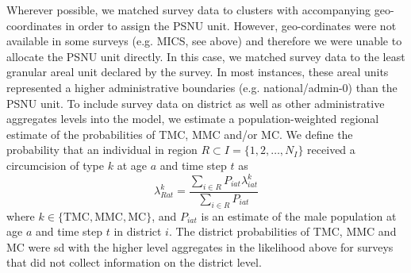 \documentclass{article}
\begin{document}
\begin{appendix}
Wherever possible, we matched survey data to clusters with accompanying geo-coordinates in order to assign the PSNU unit. However, geo-cordinates were not available in some surveys (e.g. MICS, see above) and therefore we were unable to allocate the PSNU unit directly. In this case, we matched survey data to the least granular areal unit declared by the survey. In most instances, these areal units represented a higher administrative boundaries (e.g. national/admin-0) than the PSNU unit. To include survey data on district as well as other administrative aggregates levels into the model, we estimate a population-weighted regional estimate of the probabilities of TMC, MMC and/or MC. We define the probability that an individual in region $ R \subset I = \{1, 2, \ldots, N_I\}$ received a circumcision of type $k$ at age $a$ and time step $t$ as 
\begin{equation*}
	\lambda^{k}_{Rat} = \frac{\sum_{i\in R}P_{iat}\lambda^{k}_{iat}}{\sum_{i\in R}P_{iat}}
\end{equation*}
where $k\in \{\textrm{TMC}, \textrm{MMC}, \textrm{MC}\}$, and $P_{iat}$ is an estimate of the male population at age $a$ and time step $t$ in district $i$. The district probabilities of TMC, MMC and MC were sd with the higher level aggregates in the likelihood above for surveys that did not collect information on the district level. 






\end{appendix}
\end{document}
